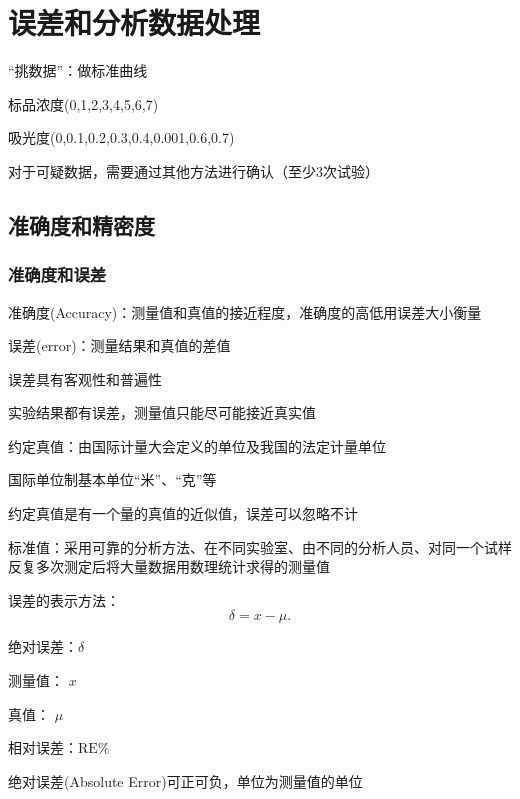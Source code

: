 \section{误差和分析数据处理}%
\label{sec:误差和分析数据处理}
\begin{notation}
    “挑数据”：做标准曲线

    标品浓度(0,1,2,3,4,5,6,7)

    吸光度(0,0.1,0.2,0.3,0.4,0.001,0.6,0.7)

    对于可疑数据，需要通过其他方法进行确认（至少3次试验）
\end{notation}
\subsection{准确度和精密度}%
\label{sub:准确度和精密度}
\subsubsection{准确度和误差}%
\label{subsub:准确度和误差}
\begin{defi}
    准确度(Accuracy)：测量值和真值的接近程度，准确度的高低用误差大小衡量
\end{defi}
\begin{defi}
    误差(error)：测量结果和真值的差值
\end{defi}
误差具有客观性和普遍性

实验结果都有误差，测量值只能尽可能接近真实值
\begin{defi}
    约定真值：由国际计量大会定义的单位及我国的法定计量单位
    \begin{eg}
        国际单位制基本单位“米”、“克”等
    \end{eg}
    \begin{notation}
        约定真值是有一个量的真值的近似值，误差可以忽略不计
    \end{notation}
\end{defi}

\begin{defi}
    标准值：采用可靠的分析方法、在不同实验室、由不同的分析人员、对同一个试样反复多次测定后将大量数据用数理统计求得的测量值
\end{defi}
误差的表示方法：\[
    \delta=x-\mu
.\] 
\begin{defi}
    绝对误差：$\delta$

    测量值： $x$

    真值： $\mu$ 

    相对误差：$\text{RE}\%$
\end{defi}
绝对误差(Absolute Error)可正可负，单位为测量值的单位

